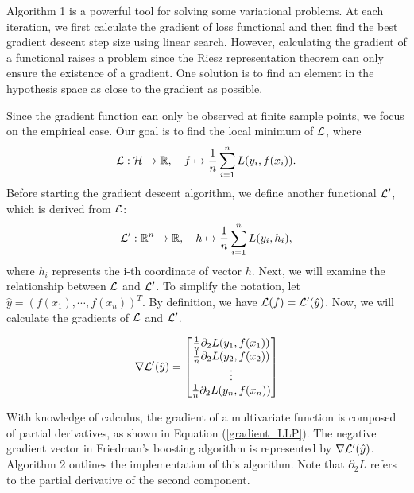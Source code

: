 Algorithm 1 is a powerful tool for solving some variational problems. At each iteration, we first calculate the gradient of loss functional and then find the best gradient descent step size using linear search. However, calculating the gradient of a functional raises a problem since the Riesz representation theorem can only ensure the existence of a gradient. 
One solution is to find an element in the hypothesis space as close to the gradient as possible. 

Since the gradient function can only be observed at finite sample points, we focus on the empirical case. Our goal is to find the local minimum of $\mathcal{L}$, where
\begin{equation}\label{eq:EmpiricalLoss} \mathcal{L}: \mathcal{H} \to \mathbb{R}, \quad f \mapsto \frac{1}{n} \sum_{i=1}^n L(y_i, f(x_i)). \end{equation}
Before starting the gradient descent algorithm, we define another functional $\mathcal{L}^\prime$, which is derived from $\mathcal{L}$:
\begin{equation} \mathcal{L}^\prime: \mathbb{R}^n \to \mathbb{R}, \quad h \mapsto \frac{1}{n} \sum_{i=1}^n L(y_i, h_i), \end{equation}
where $h_i$ represents the i-th coordinate of vector $h$.
Next, we will examine the relationship between $\mathcal{L}$ and $\mathcal{L}^\prime$. To simplify the notation, let $\hat y = (f(x_1),\cdots, f(x_n))^T$. By definition, we have $\mathcal{L}(f) = \mathcal{L}^\prime(\hat y)$. Now, we will calculate the gradients of $\mathcal{L}$ and $\mathcal{L}^\prime$.


\begin{equation}\label{gradient_LLP}
\nabla \mathcal{L}^\prime (\hat y) = \begin{bmatrix}
	 \frac{1}{n} \partial_2 L (y_1, f(x_1)) \\ 
	 \frac{1}{n} \partial_2 L (y_2, f(x_2)) \\ 
	\vdots \\
	 \frac{1}{n} \partial_2 L (y_n, f(x_n)) \\ 
\end{bmatrix}
\end{equation}


With knowledge of calculus, the gradient of a multivariate function is composed of partial derivatives, as shown in Equation (\ref{gradient_LLP}). The negative gradient vector in Friedman's boosting algorithm is represented by $\nabla \mathcal{L}^\prime (\hat y)$. Algorithm 2 outlines the implementation of this algorithm. Note that $\partial_2 L$ refers to the partial derivative of the second component.

